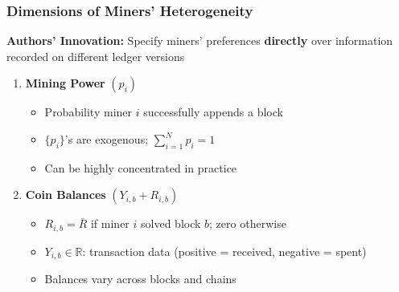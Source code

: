 \documentclass[aspectratio=169, 12pt]{beamer}
\begin{document}
\begin{frame}
\frametitle{Dimensions of Miners' Heterogeneity}

\textbf{Authors' Innovation:} Specify miners' preferences \textbf{directly} over information recorded on different ledger versions

\vspace{0.5em}

\begin{enumerate}
    \item \textbf{Mining Power} $(p_i)$
    \begin{itemize}
        \item Probability miner $i$ successfully appends a block
        \item $\{p_i\}$'s are  exogenous;  $\sum_{i=1}^N p_i = 1$
        \item Can be highly concentrated in practice
    \end{itemize}

    \vspace{0.5em}

    \item \textbf{Coin Balances} $(Y_{i,b} + R_{i,b})$
    \begin{itemize}
        \item $R_{i,b} = \bar{R}$ if miner $i$ solved block $b$; zero otherwise
        \item $Y_{i,b} \in \mathbb{R}$: transaction data (positive = received, negative = spent)
        \item Balances vary across blocks and chains
    \end{itemize}
\end{enumerate}

\end{frame}
\end{document}
